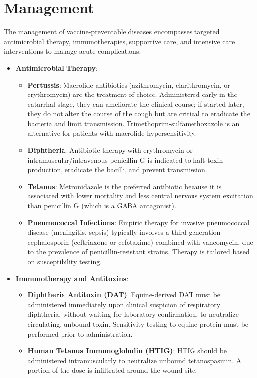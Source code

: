 \section*{Management}
The management of vaccine-preventable diseases encompasses targeted antimicrobial therapy, immunotherapies, supportive care, and intensive care interventions to manage acute complications.
\begin{itemize}
    \item \textbf{Antimicrobial Therapy}:
    \begin{itemize}
        \item \textbf{Pertussis}: Macrolide antibiotics (azithromycin, clarithromycin, or erythromycin) are the treatment of choice. Administered early in the catarrhal stage, they can ameliorate the clinical course; if started later, they do not alter the course of the cough but are critical to eradicate the bacteria and limit transmission. Trimethoprim-sulfamethoxazole is an alternative for patients with macrolide hypersensitivity.
        \item \textbf{Diphtheria}: Antibiotic therapy with erythromycin or intramuscular/intravenous penicillin G is indicated to halt toxin production, eradicate the bacilli, and prevent transmission.
        \item \textbf{Tetanus}: Metronidazole is the preferred antibiotic because it is associated with lower mortality and less central nervous system excitation than penicillin G (which is a GABA antagonist).
        \item \textbf{Pneumococcal Infections}: Empiric therapy for invasive pneumococcal disease (meningitis, sepsis) typically involves a third-generation cephalosporin (ceftriaxone or cefotaxime) combined with vancomycin, due to the prevalence of penicillin-resistant strains. Therapy is tailored based on susceptibility testing.
    \end{itemize}
    \item \textbf{Immunotherapy and Antitoxins}:
    \begin{itemize}
        \item \textbf{Diphtheria Antitoxin (DAT)}: Equine-derived DAT must be administered immediately upon clinical suspicion of respiratory diphtheria, without waiting for laboratory confirmation, to neutralize circulating, unbound toxin. Sensitivity testing to equine protein must be performed prior to administration.
        \item \textbf{Human Tetanus Immunoglobulin (HTIG)}: HTIG should be administered intramuscularly to neutralize unbound tetanospasmin. A portion of the dose is infiltrated around the wound site.

\end{itemize}
\end{itemize}
